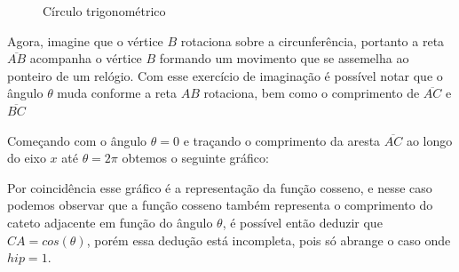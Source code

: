 \begin{multicols*}{2}
    \begin{figure}[H]
        \centering
        \caption{Círculo trigonométrico}
        \label{fig:circ_trig}
    \end{figure}

    Agora, imagine que o vértice $B$ rotaciona sobre a circunferência, portanto
    a reta $\overline{AB}$ acompanha o vértice $B$ formando um movimento que se assemelha
    ao ponteiro de um relógio. Com esse exercício de imaginação é possível notar
    que o ângulo $\theta$ muda conforme a reta $AB$ rotaciona, bem como o
    comprimento de $\overline{AC}$ e $\overline{BC}$

    Começando com o ângulo $\theta=0$ e traçando o comprimento da aresta $\overline{AC}$
    ao longo do eixo $x$ até $\theta=2\pi$ obtemos o seguinte gráfico:

    \begin{figure}[H]
        \centering
    \end{figure}


    Por coincidência esse gráfico é a representação da função cosseno,
    e nesse caso podemos observar que a função cosseno também representa o
    comprimento do cateto adjacente em função do ângulo $\theta$, é possível
    então deduzir que $CA = cos(\theta)$, porém essa dedução está incompleta,
    pois só abrange o caso onde $hip = 1$.


\end{multicols*}
